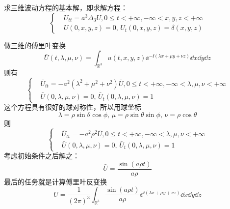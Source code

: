 \begin{problembox}
    \begin{example}
        求三维波动方程的基本解，即求解方程：
        \begin{equation*}
            \left\{
                \begin{aligned}
                    &U_{tt} = a^3 \Delta_3 U, 0 \leq t < +\infty, -\infty < x, y, z < +\infty\\
                    &U(0, x, y, z) = 0,\, U_t(0, x, y, z) = \delta(x, y, z)
                \end{aligned}
            \right.
        \end{equation*}
    \end{example}
    \begin{solution}
        做三维的傅里叶变换
        \[\bar{U}(t, \lambda, \mu, \nu) = \int_{\mathbb{R}^3} u(t, x, y, z) \ee^{-\ii \left(\lambda x + \mu y + \nu z\right)} \dd{x} \dd{y} \dd{z}\]
        则有
        \begin{equation*}
            \left\{
                \begin{aligned}
                    &\bar{U}_{tt} = - a^2 \left(\lambda^2 + \mu^2 + \nu^2\right) \bar{U}, 0 \leq t < +\infty, -\infty < \lambda, \mu, \nu < +\infty\\
                    &\bar{U}(0, \lambda, \mu, \nu) = 0,\, \bar{U}_t(0, \lambda, \mu, \nu) = 1
                \end{aligned}
            \right.
        \end{equation*}
        这个方程具有很好的球对称性，所以用球坐标
        \[\lambda = \rho \sin \theta \cos \phi,\, \mu = \rho \sin \theta \sin \phi,\, \nu = \rho \cos \theta\]
        则
        \begin{equation*}
            \left\{
                \begin{aligned}
                    &\bar{U}_{tt} = - a^2 \rho^2 \bar{U}, 0 \leq t < +\infty, -\infty < \lambda, \mu, \nu < +\infty\\
                    &\bar{U}(0, \lambda, \mu, \nu) = 0,\, \bar{U}_t(0, \lambda, \mu, \nu) = 1
                \end{aligned}
            \right.
        \end{equation*}
        考虑初始条件之后解之：
        \[\bar{U} = \frac{\sin(a \rho t)}{a \rho}\]
        最后的任务就是计算傅里叶反变换
        \[U = \frac{1}{\left(2 \pi\right)^3} \int_{\mathbb{R}^3} \frac{\sin(a \rho t)}{a \rho} \ee^{\ii\left(\lambda x + \mu y + \nu z\right)} \dd{x} \dd{y} \dd{z}\]

\end{solution}
\end{problembox}

